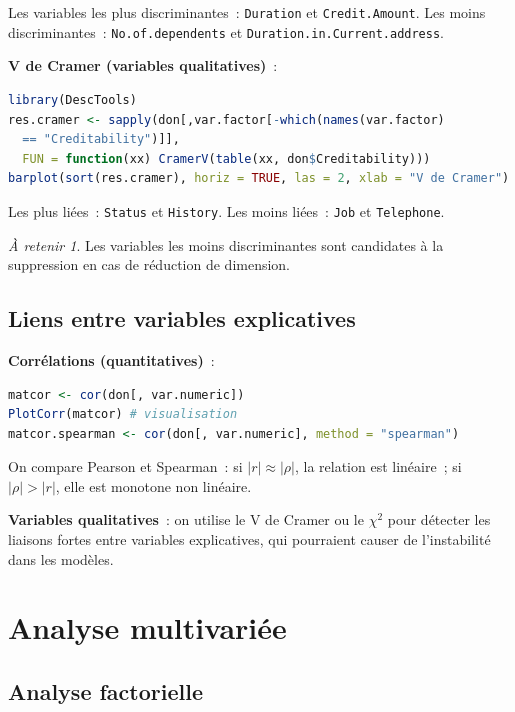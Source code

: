 \documentclass[a4paper,11pt]{article}
\theoremstyle{definition}
\theoremstyle{remark}
\newtheorem*{important}{À retenir}
\begin{document}
Les variables les plus discriminantes~: \texttt{Duration} et
\texttt{Credit.Amount}. Les moins discriminantes~:
\texttt{No.of.dependents} et \texttt{Duration.in.Current.address}.

\textbf{V de Cramer (variables qualitatives)}~:
\begin{lstlisting}[language=R]
library(DescTools)
res.cramer <- sapply(don[,var.factor[-which(names(var.factor)
  == "Creditability")]],
  FUN = function(xx) CramerV(table(xx, don$Creditability)))
barplot(sort(res.cramer), horiz = TRUE, las = 2, xlab = "V de Cramer")
\end{lstlisting}

Les plus liées~: \texttt{Status} et \texttt{History}.
Les moins liées~: \texttt{Job} et \texttt{Telephone}.

\begin{important}
  Les variables les moins discriminantes sont candidates à la
  suppression en cas de réduction de dimension.
\end{important}

\subsection{Liens entre variables explicatives}

\textbf{Corrélations (quantitatives)}~:
\begin{lstlisting}[language=R]
matcor <- cor(don[, var.numeric])
PlotCorr(matcor) # visualisation
matcor.spearman <- cor(don[, var.numeric], method = "spearman")
\end{lstlisting}

On compare Pearson et Spearman~: si $|r| \approx |\rho|$, la relation
est linéaire~; si $|\rho| > |r|$, elle est monotone non linéaire.

\textbf{Variables qualitatives}~: on utilise le V de Cramer ou le
$\chi^2$ pour détecter les liaisons fortes entre variables explicatives,
qui pourraient causer de l'instabilité dans les modèles.

\section{Analyse multivariée}

\subsection{Analyse factorielle}
\end{document}
